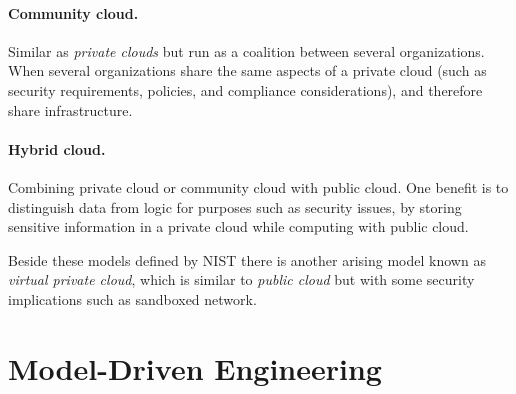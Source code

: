 \paragraph{Community cloud.}

Similar as \emph{private clouds} but run as a coalition between several organizations.
When several organizations share the same aspects of
a private cloud (such as security requirements, policies, and compliance considerations),
and therefore share infrastructure. 

\paragraph{Hybrid cloud.}

Combining private cloud or community cloud with public cloud.
One benefit is to distinguish data from logic for purposes such as security issues,
by storing sensitive information in a private cloud while computing with public cloud.

Beside these models defined by NIST there is another arising model known as 
\emph{virtual private cloud}, which is similar to \emph{public cloud} 
but with some security implications such as sandboxed network.

\section{Model-Driven Engineering}

